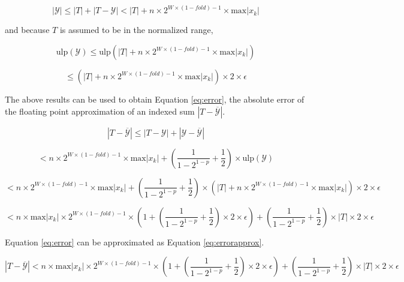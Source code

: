 \documentclass[12pt]{article}
\providecommand{\max}{\ensuremath{\text{max}}}
\providecommand{\ulp}{\ensuremath{\text{ulp}}}
\theoremstyle{plain}
\begin{document}
    \begin{equation*}
      |\mathcal{Y}| \leq |T| + |T - \mathcal{Y}| < |T| + n \times 2^{W \times (1 - fold) - 1} \times \max|x_k|
    \end{equation*}

    and because $T$ is assumed to be in the normalized range,

    \begin{equation*}
      \ulp(\mathcal{Y}) \leq \ulp(|T| + n \times 2^{W \times (1 - fold) - 1} \times \max|x_k|)
    \end{equation*}

    \begin{equation*}
    \leq (|T| + n \times 2^{W \times (1 - fold) - 1} \times \max|x_k|) \times 2 \times \epsilon
    \end{equation*}

    The above results can be used to obtain Equation \ref{eq:error}, the absolute error of the floating point approximation of an indexed sum $|T - \overline{\mathcal{Y}}|$.

    \begin{equation*}
      |T - \overline{\mathcal{Y}}| \leq |T - \mathcal{Y}| + |\mathcal{Y} - \overline{\mathcal{Y}}|
    \end{equation*}

    \begin{equation*}
      < n \times 2^{W \times (1 - fold) - 1} \times \max|x_k| + (\frac{1}{1 - 2^{1 - p}} + \frac{1}{2})\times \ulp(\mathcal{Y})
    \end{equation*}

    \begin{equation*}
      < n \times 2^{W \times (1 - fold) - 1} \times \max|x_k| + (\frac{1}{1 - 2^{1 - p}} + \frac{1}{2})\times(|T| + n \times 2^{W \times (1 - fold) - 1} \times \max|x_k|) \times 2 \times \epsilon
    \end{equation*}

    \begin{equation}
      < n \times \max|x_k|\times 2^{W \times (1 - fold) - 1} \times(1 + (\frac{1}{1 - 2^{1 - p}} + \frac{1}{2}) \times 2 \times \epsilon) + (\frac{1}{1 - 2^{1 - p}} + \frac{1}{2})\times |T| \times 2 \times \epsilon
      \label{eq:error}
    \end{equation}

    Equation \ref{eq:error} can be approximated as Equation \ref{eq:errorapprox}.

    \begin{equation*}
      |T - \overline{\mathcal{Y}}| < n \times \max|x_k|\times 2^{W \times (1 - fold) - 1} \times(1 + (\frac{1}{1 - 2^{1 - p}} + \frac{1}{2}) \times 2 \times \epsilon) + (\frac{1}{1 - 2^{1 - p}} + \frac{1}{2})\times |T| \times 2 \times \epsilon
    \end{equation*}
\end{document}
